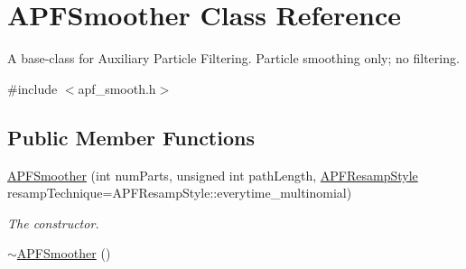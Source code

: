\hypertarget{classAPFSmoother}{}\section{A\+P\+F\+Smoother Class Reference}
\label{classAPFSmoother}


A base-\/class for Auxiliary Particle Filtering. Particle smoothing only; no filtering.  




{\ttfamily \#include $<$apf\+\_\+smooth.\+h$>$}

\subsection*{Public Member Functions}
\begin{DoxyCompactItemize}
\item 
\hyperlink{classAPFSmoother_a51d9a70bc16259592f9a92fcd1008bc3}{A\+P\+F\+Smoother} (int num\+Parts, unsigned int path\+Length, \hyperlink{apf__filter_8h_a187a7338bc8872e7607cf1ea4ffed47b}{A\+P\+F\+Resamp\+Style} resamp\+Technique=A\+P\+F\+Resamp\+Style\+::everytime\+\_\+multinomial)
\begin{DoxyCompactList}\small\item\em The constructor. \end{DoxyCompactList}\item 
\hyperlink{classAPFSmoother_a12ee69daa15fc1f59a8efd9303894896}{$\sim$\+A\+P\+F\+Smoother} ()\hypertarget{classAPFSmoother_a12ee69daa15fc1f59a8efd9303894896}{}\label{classAPFSmoother_a12ee69daa15fc1f59a8efd9303894896}


\end{DoxyCompactItemize}
